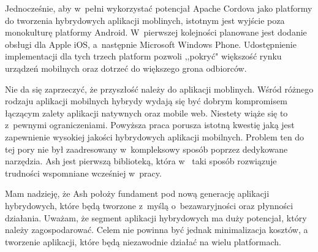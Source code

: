 \documentclass{xmgr}
\begin{document}
Jednocześnie, aby w~pełni wykorzystać potencjał Apache Cordova jako platformy do tworzenia hybrydowych aplikacji moblinych, istotnym jest wyjście poza monokulturę platformy Android. W~pierwszej kolejności planowane jest dodanie obsługi dla Apple iOS, a~następnie Microsoft Windows Phone.  Udostępnienie implementacji dla tych trzech platform pozwoli ,,pokryć" większość rynku urządzeń mobilnych oraz dotrzeć do większego grona odbiorców. 

\summary

Nie da się zaprzeczyć, że przyszłość należy do aplikacji moblinych. Wśród różnego rodzaju aplikacji mobilnych hybrydy wydają się być dobrym kompromisem łączącym zalety aplikacji natywnych oraz mobile web. Niestety wiąże się to z~pewnymi ograniczeniami. Powyższa praca porusza istotną kwestię jaką jest zapewnienie wysokiej jakości hybrydowych aplikacji mobilnych. Problem ten do tej pory nie był zaadresowany w~kompleksowy sposób poprzez dedykowane narzędzia. Ash jest pierwszą biblioteką, która w~ taki sposób rozwiązuje trudności wspomniane wcześniej w~pracy.

Mam nadzieję, że Ash położy fundament pod nową generację aplikacji hybrydowych, które będą tworzone z~myślą o~bezawaryjności oraz płynności działania. Uważam, że segment aplikacji hybrydowych ma duży potencjał, który należy zagospodarować.  Celem nie powinna być jednak minimalizacja kosztów, a tworzenie aplikacji, które będą niezawodnie działać na wielu platformach.

\nocite{*}

\appendix






\oswiadczenie
\end{document}
